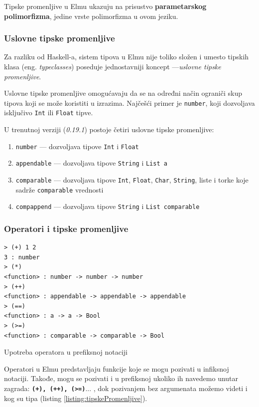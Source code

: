 \documentclass[12pt,oneside]{memoir}
\begin{document}
Tipske promenljive u Elmu ukazuju na prisustvo \textbf{parametarskog polimorfizma},
jedine vrste polimorfizma u ovom jeziku.

\subsubsection{Uslovne tipske promenljive}
Za razliku od Haskell-a, sistem tipova u Elmu nije toliko složen i umesto tipskih 
klasa (eng. \emph{typeclasses})\cite{typeclasses} poseduje jednostavniji koncept
---\emph{uslovne tipske promenljive}. 

Uslovne tipske promenljive omogućavaju da se na određni način ograniči skup tipova
koji se može koristiti u izrazima. Najčešći primer je \texttt{number}, koji dozvoljava 
isključivo \texttt{Int} ili \texttt{Float} tipve. 

U trenutnoj verziji (\emph{0.19.1}) postoje četiri uslovne tipske promenljive:
\begin{enumerate}
  \item \texttt{number} --- dozvoljava tipove \texttt{Int} i \texttt{Float}
  \item \texttt{appendable} --- dozvoljava tipove \texttt{String} i \texttt{List a}
  \item \texttt{comparable} --- dozvoljava tipove \texttt{Int}, \texttt{Float}, \texttt{Char},
  \texttt{String}, liste i torke koje sadrže \texttt{comparable} vrednosti
  \item \texttt{compappend} --- dozvoljava tipove \texttt{String} i \texttt{List comparable}
\end{enumerate}

\subsubsection{Operatori i tipske promenljive}
\begin{listing}[h]
\begin{verbatim}
> (+) 1 2
3 : number
> (*)
<function> : number -> number -> number
> (++)
<function> : appendable -> appendable -> appendable
> (==)
<function> : a -> a -> Bool
> (>=)
<function> : comparable -> comparable -> Bool
\end{verbatim}
\caption{Upotreba operatora u prefiksnoj notaciji}
\label{listing:tipskePromenljive}
\end{listing}
Operatori u Elmu predstavljaju funkcije koje se mogu pozivati u infiksnoj notaciji. Takođe, 
mogu se pozivati i u prefiksnoj ukoliko ih navedemo unutar zagrada: \texttt{\textbf{(+),
(++), (>=)}}... , dok pozivanjem bez argumenata možemo videti i kog su tipa (listing \ref{listing:tipskePromenljive}).
\end{document}
